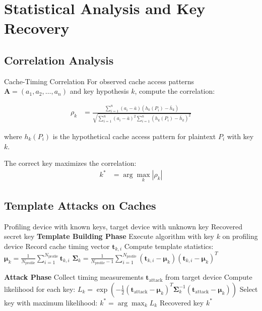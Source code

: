 \documentclass[11pt,a4paper]{article}
\theoremstyle{definition}
\begin{document}
\section{Statistical Analysis and Key Recovery}

\subsection{Correlation Analysis}

\begin{mathematicsbox}{Cache-Timing Correlation}
For observed cache access patterns $\mathbf{A} = (a_1, a_2, \ldots, a_n)$ and key hypothesis $k$, compute the correlation:

\begin{align}
\rho_k &= \frac{\sum_{i=1}^n (a_i - \bar{a})(h_k(P_i) - \bar{h}_k)}{\sqrt{\sum_{i=1}^n (a_i - \bar{a})^2 \sum_{i=1}^n (h_k(P_i) - \bar{h}_k)^2}}
\end{align}

where $h_k(P_i)$ is the hypothetical cache access pattern for plaintext $P_i$ with key $k$.

The correct key maximizes the correlation:
\begin{align}
k^* &= \arg\max_k |\rho_k|
\end{align}
\end{mathematicsbox}

\subsection{Template Attacks on Caches}

\begin{algorithm}
\caption{Cache Template Attack}
\begin{algorithmic}[1]
\REQUIRE Profiling device with known keys, target device with unknown key
\ENSURE Recovered secret key
\STATE \textbf{Template Building Phase}
        \STATE Execute algorithm with key $k$ on profiling device
        \STATE Record cache timing vector $\mathbf{t}_{k,i}$
    \ENDFOR
    \STATE Compute template statistics:
    \STATE $\boldsymbol{\mu}_k = \frac{1}{N_{\text{profile}}} \sum_{i=1}^{N_{\text{profile}}} \mathbf{t}_{k,i}$
    \STATE $\boldsymbol{\Sigma}_k = \frac{1}{N_{\text{profile}}-1} \sum_{i=1}^{N_{\text{profile}}} (\mathbf{t}_{k,i} - \boldsymbol{\mu}_k)(\mathbf{t}_{k,i} - \boldsymbol{\mu}_k)^T$
\ENDFOR

\STATE \textbf{Attack Phase}
\STATE Collect timing measurements $\mathbf{t}_{\text{attack}}$ from target device
\STATE Compute likelihood for each key:
\STATE $L_k = \exp\left(-\frac{1}{2}(\mathbf{t}_{\text{attack}} - \boldsymbol{\mu}_k)^T \boldsymbol{\Sigma}_k^{-1} (\mathbf{t}_{\text{attack}} - \boldsymbol{\mu}_k)\right)$
\STATE Select key with maximum likelihood: $k^* = \arg\max_k L_k$
\RETURN Recovered key $k^*$
\end{algorithmic}
\end{algorithm}
\end{document}
